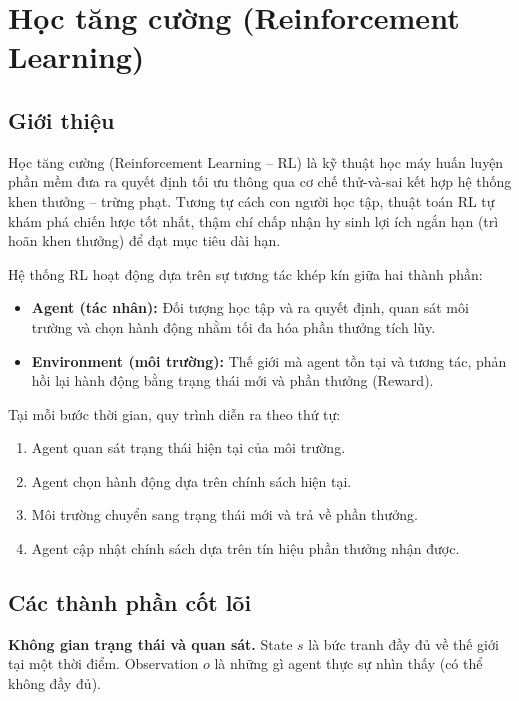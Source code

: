 \section{Học tăng cường (Reinforcement Learning)}

\subsection{Giới thiệu}

Học tăng cường (Reinforcement Learning -- RL) là kỹ thuật học máy huấn luyện
phần mềm đưa ra quyết định tối ưu thông qua cơ chế thử-và-sai kết hợp hệ thống
khen thưởng -- trừng phạt. Tương tự cách con người học tập, thuật toán RL tự
khám phá chiến lược tốt nhất, thậm chí chấp nhận hy sinh lợi ích ngắn hạn
(trì hoãn khen thưởng) để đạt mục tiêu dài hạn.

Hệ thống RL hoạt động dựa trên sự tương tác khép kín giữa hai thành phần:
\begin{itemize}
    \item \textbf{Agent (tác nhân):} Đối tượng học tập và ra quyết định, quan
    sát môi trường và chọn hành động nhằm tối đa hóa phần thưởng tích lũy.
    \item \textbf{Environment (môi trường):} Thế giới mà agent tồn tại và tương
    tác, phản hồi lại hành động bằng trạng thái mới và phần thưởng (Reward).
\end{itemize}

Tại mỗi bước thời gian, quy trình diễn ra theo thứ tự:
\begin{enumerate}
    \item Agent quan sát trạng thái hiện tại của môi trường.
    \item Agent chọn hành động dựa trên chính sách hiện tại.
    \item Môi trường chuyển sang trạng thái mới và trả về phần thưởng.
    \item Agent cập nhật chính sách dựa trên tín hiệu phần thưởng nhận được.
\end{enumerate}

\subsection{Các thành phần cốt lõi}

\textbf{Không gian trạng thái và quan sát.}
State $s$ là bức tranh đầy đủ về thế giới tại một thời điểm.
Observation $o$ là những gì agent thực sự nhìn thấy (có thể không đầy đủ).

